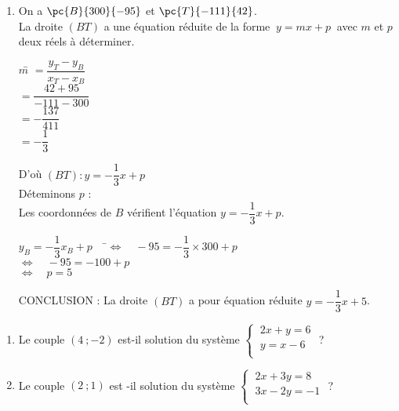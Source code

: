 \documentclass[a4paper,11pt,exos]{nsi} %
\begin{document}
\begin{enumerate}[label=\textbullet]
    \item On a $\pc{B}{300}{-95}$ et $\pc{T}{-111}{42}$.\\
    La droite $(BT)$ a une équation réduite de la forme $\ y=mx+p\ $ avec $m$ et $p$ deux réels à déterminer.
    \begin{tabbing}
        $m$\=   $=\dfrac{y_T-y_B}{x_T-x_B}$\\[.5em]
        \>  $=\dfrac{42+95}{-111-300}$\\[.5em]
        \>  $=-\dfrac{137}{411}$\\[.5em]
        \>  $=-\dfrac{1}{3}$
    \end{tabbing}
    D'où $(BT) : y=-\dfrac{1}{3}x+p$\\
    Déteminons $p$ :\\
    Les coordonnées de $B$ vérifient l'équation $y=-\dfrac{1}{3}x+p$.
    \begin{tabbing}
        $y_B=-\dfrac{1}{3}x_B+p\quad$   \=$\iff\quad -95=-\dfrac{1}{3}\times 300+p$\\[.5em]
        \>  $\iff\quad -95=-100+p$\\[.5em]
        \>  $\iff\quad  p=5$
    \end{tabbing}
    CONCLUSION : La droite $(BT)$ a pour équation réduite $y=-\dfrac{1}{3}x+5$.
\end{enumerate}

\begin{exercice}[ ]
	\begin{enumerate}
		\item 	Le couple $(4\ ;-2)$ est-il solution du système $\left\{
		\begin{array}{l}
			\ 2x+y=6 \\
			\ y=x-6 \\
		\end{array} \right.$ ?
		\item 	Le couple $(2\ ;1)$ est -il solution du système $\left\{
		\begin{array}{l}
			\ 2x+3y=8 \\
			\ 3x-2y=-1 \\
		\end{array} \right.$ ?
	\end{enumerate}
\end{exercice}
\end{document}
